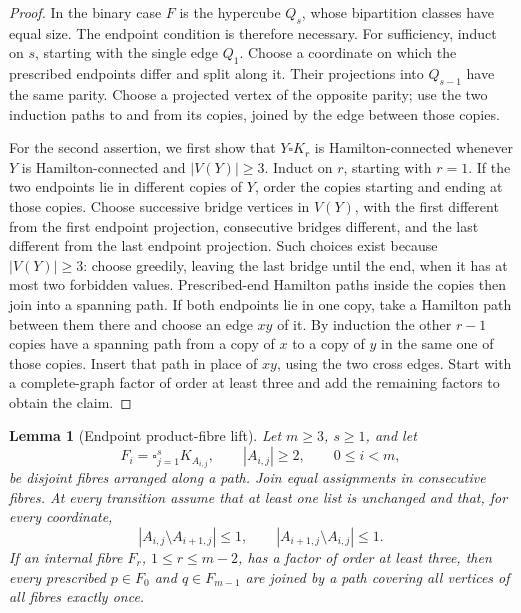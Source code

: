 \documentclass[11pt]{article}
\newtheorem{lemma}[theorem]{Lemma}
\theoremstyle{remark}
\numberwithin{equation}{section}
\numberwithin{table}{section}
\begin{document}
\begin{proof}
In the binary case $F$ is the hypercube $Q_s$, whose bipartition
classes have equal size.  The endpoint condition is therefore necessary.
For sufficiency, induct on $s$, starting with the single edge $Q_1$.
Choose a coordinate on which the prescribed endpoints differ and split
along it.  Their projections into $Q_{s-1}$ have the same parity.  Choose
a projected vertex of the opposite parity; use the two induction paths
to and from its copies, joined by the edge between those copies.

For the second assertion, we first show that $Y\square K_r$ is
Hamilton-connected whenever $Y$ is Hamilton-connected and
$|V(Y)|\ge3$.  Induct on $r$, starting with $r=1$.  If the two
endpoints lie in different copies of $Y$, order the copies starting and
ending at those copies.  Choose successive bridge vertices in $V(Y)$,
with the first different from the first endpoint projection, consecutive
bridges different, and the last different from the last endpoint
projection.  Such choices exist because $|V(Y)|\ge3$: choose greedily,
leaving the last bridge until the end, when it has at most two forbidden
values.  Prescribed-end Hamilton paths inside the copies then join into
a spanning path.  If both endpoints lie in one copy, take a Hamilton
path between them there and choose an edge $xy$ of it.  By induction the
other $r-1$ copies have a spanning path from a copy of $x$ to a copy of
$y$ in the same one of those copies.  Insert that path in place of
$xy$, using the two cross edges.  Start with a complete-graph factor of
order at least three and add the remaining factors to obtain the claim.
\end{proof}

\begin{lemma}[Endpoint product-fibre lift]
\label{lem:path-fibre}
Let $m\ge3$, $s\ge1$, and let
\[
 F_i=\square_{j=1}^s K_{A_{i,j}},\qquad |A_{i,j}|\ge2,
 \qquad 0\le i<m,
\]
be disjoint fibres arranged along a path.  Join equal assignments in
consecutive fibres.  At every transition assume that at least one list
is unchanged and that, for every coordinate,
\[
 |A_{i,j}\setminus A_{i+1,j}|\le1,
 \qquad |A_{i+1,j}\setminus A_{i,j}|\le1.
\]
If an internal fibre $F_r$, $1\le r\le m-2$, has a factor of order
at least three, then every prescribed $p\in F_0$ and $q\in F_{m-1}$
are joined by a path covering all vertices of all fibres exactly once.
\end{lemma}
\end{document}
